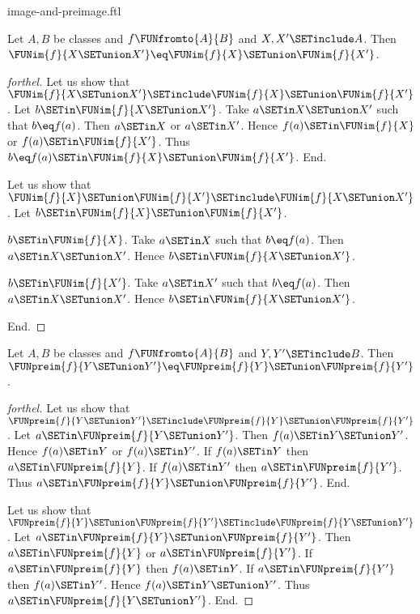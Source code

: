\documentclass{naproche-library}
\begin{document}
\begin{smodule}[title=Computation Laws for Images and Preimages]{image-and-preimage.ftl}
\begin{proposition}[forthel,id=FOUNDATIONS_07_4448961469349888]
  Let $A, B$ be classes and $f \FUNfromto{A}{B}$ and $X, X' \SETinclude A$.
  Then $\FUNim{f}{X \SETunion X'} \eq \FUNim{f}{X} \SETunion \FUNim{f}{X'}$.
\end{proposition}
\begin{proof}[forthel]
  Let us show that $\FUNim{f}{X \SETunion X'} \SETinclude \FUNim{f}{X} \SETunion \FUNim{f}{X'}$.
    Let $b \SETin \FUNim{f}{X \SETunion X'}$.
    Take $a \SETin X \SETunion X'$ such that $b \eq f(a)$.
    Then $a \SETin X$ or $a \SETin X'$.
    Hence $f(a) \SETin \FUNim{f}{X}$ or $f(a) \SETin \FUNim{f}{X'}$.
    Thus $b \eq f(a) \SETin \FUNim{f}{X} \SETunion \FUNim{f}{X'}$.
  End.

  Let us show that $\FUNim{f}{X} \SETunion \FUNim{f}{X'} \SETinclude \FUNim{f}{X \SETunion X'}$.
    Let $b \SETin \FUNim{f}{X} \SETunion \FUNim{f}{X'}$.

    \begin{case}{$b \SETin \FUNim{f}{X}$.}
      Take $a \SETin X$ such that $b \eq f(a)$.
      Then $a \SETin X \SETunion X'$.
      Hence $b \SETin \FUNim{f}{X \SETunion X'}$.
    \end{case}

    \begin{case}{$b \SETin \FUNim{f}{X'}$.}
      Take $a \SETin X'$ such that $b \eq f(a)$.
      Then $a \SETin X \SETunion X'$.
      Hence $b \SETin \FUNim{f}{X \SETunion X'}$.
    \end{case}
  End.
\end{proof}

\begin{proposition}[forthel,id=FOUNDATIONS_07_1547089051910144]
  Let $A, B$ be classes and $f \FUNfromto{A}{B}$ and $Y, Y' \SETinclude B$.
  Then $\FUNpreim{f}{Y \SETunion Y'} \eq \FUNpreim{f}{Y} \SETunion \FUNpreim{f}{Y'}$.
\end{proposition}
\begin{proof}[forthel]
  Let us show that $\FUNpreim{f}{Y \SETunion Y'} \SETinclude \FUNpreim{f}{Y} \SETunion \FUNpreim{f}{Y'}$.
    Let $a \SETin \FUNpreim{f}{Y \SETunion Y'}$.
    Then $f(a) \SETin Y \SETunion Y'$.
    Hence $f(a) \SETin Y$ or $f(a) \SETin Y'$.
    If $f(a) \SETin Y$ then $a \SETin \FUNpreim{f}{Y}$.
    If $f(a) \SETin Y'$ then $a \SETin \FUNpreim{f}{Y'}$.
    Thus $a \SETin \FUNpreim{f}{Y} \SETunion \FUNpreim{f}{Y'}$.
  End.

  Let us show that $\FUNpreim{f}{Y} \SETunion \FUNpreim{f}{Y'} \SETinclude \FUNpreim{f}{Y \SETunion Y'}$.
    Let $a \SETin \FUNpreim{f}{Y} \SETunion \FUNpreim{f}{Y'}$.
    Then $a \SETin \FUNpreim{f}{Y}$ or $a \SETin \FUNpreim{f}{Y'}$.
    If $a \SETin \FUNpreim{f}{Y}$ then $f(a) \SETin Y$.
    If $a \SETin \FUNpreim{f}{Y'}$ then $f(a) \SETin Y'$.
    Hence $f(a) \SETin Y \SETunion Y'$.
    Thus $a \SETin \FUNpreim{f}{Y \SETunion Y'}$.
  End.
\end{proof}


\end{smodule}
\end{document}
